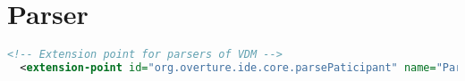 \section{Parser}

\begin{lstlisting}[language=XML]
  <!-- Extension point for parsers of VDM -->
  <extension-point id="org.overture.ide.core.parsePaticipant" name="Parser" schema="schema/org.overture.ide.core.parsePaticipant.exsd"/>
\end{lstlisting}


